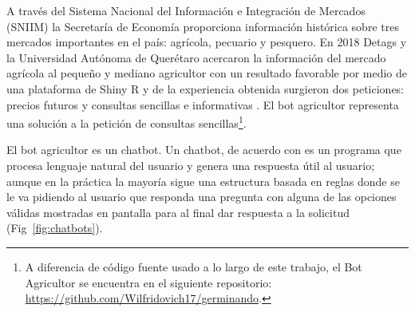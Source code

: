 A través del Sistema Nacional del Información e Integración de Mercados (SNIIM) la Secretaría de Economía proporciona información histórica sobre tres mercados importantes en el país: agrícola, pecuario y pesquero. En 2018 Detags y la Universidad Autónoma de Querétaro acercaron la información del mercado agrícola al pequeño y mediano agricultor con un resultado favorable por medio de una plataforma de Shiny R y de la experiencia obtenida surgieron dos peticiones: precios futuros y consultas sencillas e informativas \citep{detags}. El bot agricultor representa una solución a la petición de consultas sencillas\footnote{A diferencia de código fuente usado a lo largo de este trabajo, el Bot Agricultor se encuentra en el siguiente repositorio: \url{https://github.com/Wilfridovich17/germinando}.}.

El bot agricultor es un chatbot. Un chatbot, de acuerdo con \cite{khan2017build} es un programa que procesa lenguaje natural del usuario y genera una respuesta útil al usuario; aunque en la práctica la mayoría sigue una estructura basada en reglas donde se le va pidiendo al usuario que responda una pregunta con alguna de las opciones válidas mostradas en pantalla para al final dar respuesta a la solicitud (Fig~\ref{fig:chatbots}).

